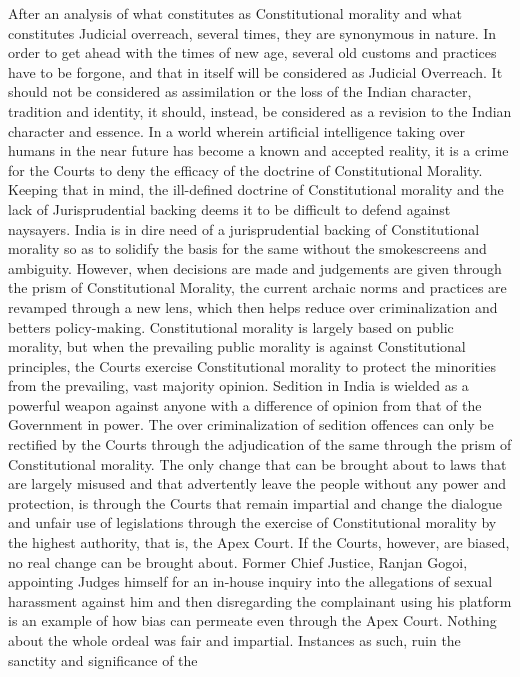 \begin{multicols}{2}
\noi
After an analysis of what constitutes as Constitutional morality and what constitutes Judicial
overreach, several times, they are synonymous in nature. In order to get ahead with the times
of new age, several old customs and practices have to be forgone, and that in itself will be
considered as Judicial Overreach. It should not be considered as assimilation or the loss of the
Indian character, tradition and identity, it should, instead, be considered as a revision to the
Indian character and essence. In a world wherein artificial intelligence taking over humans in
the near future has become a known and accepted reality, it is a crime for the Courts to deny
the efficacy of the doctrine of Constitutional Morality. Keeping that in mind, the ill-defined
doctrine of Constitutional morality and the lack of Jurisprudential backing deems it to be
difficult to defend against naysayers. India is in dire need of a jurisprudential backing of
Constitutional morality so as to solidify the basis for the same without the smokescreens and
ambiguity. However, when decisions are made and judgements are given through the prism
of Constitutional Morality, the current archaic norms and practices are revamped through a
new lens, which then helps reduce over criminalization and betters policy-making.
Constitutional morality is largely based on public morality, but when the prevailing public
morality is against Constitutional principles, the Courts exercise Constitutional morality to
protect the minorities from the prevailing, vast majority opinion. Sedition in India is wielded
as a powerful weapon against anyone with a difference of opinion from that of the
Government in power. The over criminalization of sedition offences can only be rectified by
the Courts through the adjudication of the same through the prism of Constitutional morality.
The only change that can be brought about to laws that are largely misused and that advertently leave the people without any power and protection, is through the Courts that
remain impartial and change the dialogue and unfair use of legislations through the exercise
of Constitutional morality by the highest authority, that is, the Apex Court. If the Courts,
however, are biased, no real change can be brought about. Former Chief Justice, Ranjan
Gogoi, appointing Judges himself for an in-house inquiry into the allegations of sexual
harassment against him and then disregarding the complainant using his platform is an
example of how bias can permeate even through the Apex Court. Nothing about the whole
ordeal was fair and impartial. Instances as such, ruin the sanctity and significance of the

\end{multicols}
